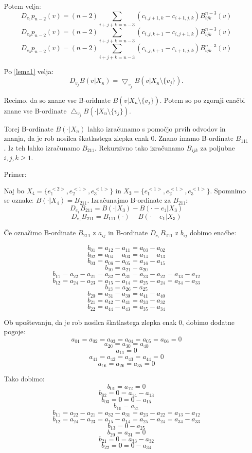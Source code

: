 \documentclass[12pt]{article}
\begin{document}
Potem velja:
$$D_{e_1} p_{n-2} (v) = (n-2)\sum_{i+j+k=n-3} (c_{i,j+1,k} - c_{i+1, j, k}) B_{ijk}^{n-3}(v)$$
$$D_{e_2} p_{n-2} (v) = (n-2)\sum_{i+j+k=n-3} (c_{i,j,k+1} - c_{i, j+1, k}) B_{ijk}^{n-3}(v)$$
$$D_{e_3} p_{n-2} (v) = (n-2)\sum_{i+j+k=n-3} (c_{i,j,k+1} - c_{i+1, j, k}) B_{ijk}^{n-3}(v)$$

Po \ref{lema1} velja: $$D_{v_j} B(v|X_n) = \bigtriangledown_{v_j} B(v | X_n \setminus \{v_j\}).$$


Recimo, da so znane vse B-oridnate $ B(v | X_n \setminus \{v_j\})$. Potem so po zgornji enačbi znane vse B-ordinate $\bigtriangleup_{v_j} B(\cdot|X_n \setminus \{v_j\})$. 

Torej B-ordinate $B(\cdot | X_n)$ lahko izračunamo s pomočjo prvih odvodov in znanja, da je rob nosilca škatlastega zlepka enak 0.
Znano imamo B-ordinate $B_{111}$. Iz teh lahko izračunamo $B_{211}$. Rekurzivno tako izračunamo $B_{ijk}$ za poljubne $i, j, k \geq 1$.


Primer:

Naj bo $X_4 = \{e_1^{<2>}, e_2^{<1>}, e_3^{<1>}\}$ in $X_3 = \{e_1^{<1>}, e_2^{<1>}, e_3^{<1>}\}$.
Spomnimo se oznake: $B(\cdot | X_4) = B_{211}$.
Izračunajmo B-ordinate za $B_{211}$:
$$D_{e_1} B_{211} = B(\cdot | X_3) - B(\cdot -e_1 | X_3)$$
$$D_{e_1} B_{211} = B_{111}(\cdot) - B(\cdot -e_1 | X_3)$$

Če označimo B-ordinate $B_{211}$ z $a_{ij}$ in B-ordinate $D_{e_1} B_{211}$ z $b_{ij}$ dobimo enačbe:

$$b_{01} = a_{12} - a_{11} = a_{03} - a_{02}$$
$$b_{02} = a_{04} - a_{03} = a_{14} - a_{13}$$
$$b_{03} = a_{06} - a_{05} = a_{16} - a_{15}$$
$$b_{10} = a_{21} - a_{20} $$
$$b_{11} = a_{22} - a_{21} = a_{32} - a_{31} = a_{23} - a_{22} = a_{13} - a_{12}$$
$$b_{12} = a_{24} - a_{23} = a_{15} - a_{14} = a_{25} - a_{24} = a_{34} - a_{33}$$
$$b_{13} = a_{26} - a_{25} $$
$$b_{20} = a_{31} - a_{30} = a_{41} - a_{40}$$
$$b_{21} = a_{42} - a_{41} = a_{33} - a_{32}$$
$$b_{22} = a_{44} - a_{43} = a_{35} - a_{34}$$

Ob upoštevanju, da je rob nosilca škatlastega zlepka enak 0, dobimo dodatne pogoje:
$$a_{01} = a_{02} = a_{03} = a_{04} = a_{05} = a_{06} = 0$$
$$a_{20} = a_{30} = a_{40}$$
$$a_{11} = 0$$
$$a_{41} = a_{42} = a_{43} = a_{44} = 0$$
$$a_{16} = a_{26} = a_{35} = 0$$

Tako dobimo:
$$b_{01} = a_{12} = 0$$
$$b_{02} = 0 = a_{14} - a_{13}$$
$$b_{03} = 0 = 0 - a_{15}$$
$$b_{10} = a_{21}  $$
$$b_{11} = a_{22} - a_{21} = a_{32} - a_{31} = a_{23} - a_{22} = a_{13} - a_{12}$$
$$b_{12} = a_{24} - a_{23} = a_{15} - a_{14} = a_{25} - a_{24} = a_{34} - a_{33}$$
$$b_{13} = 0- a_{25} $$
$$b_{20} = a_{31}  = 0$$
$$b_{21} = 0 = a_{33} - a_{32}$$
$$b_{22} =0 = 0  - a_{34}$$
\end{document}
